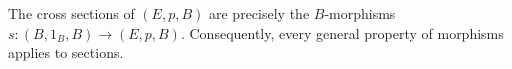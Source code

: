 The cross sections of $(E, p, B)$ are precisely the $B$-morphisms $s: (B, 1_B, B) \rightarrow (E, p, B)$. Consequently, every general property of morphisms applies to sections.
